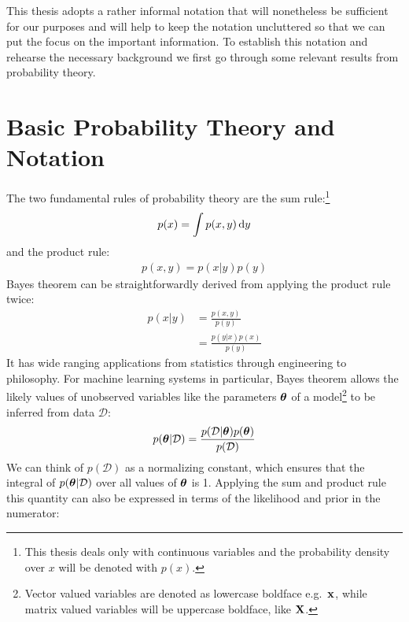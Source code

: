 \documentclass[../thesis.tex]{subfiles}
\begin{document}
This thesis adopts a rather informal notation that will nonetheless be sufficient for our purposes and will help to keep the notation uncluttered so that we can put the focus on the important information.
To establish this notation and rehearse the necessary background we first go through some relevant results from probability theory. 
\section{Basic Probability Theory and Notation}
The two fundamental rules of probability theory are the sum rule:\footnote{This thesis deals only with continuous variables and the probability density over $x$ will be denoted with $p(x)$.}
\begin{equation}
    \begin{split}
        p(x) = \int p(x, y) \mathop{}\!\mathrm{d} y
    \end{split}
\end{equation}
and the product rule:
\begin{equation}
    \begin{split}
        p(x, y) = p(x|y)p(y)
    \end{split}
\end{equation}
Bayes theorem can be straightforwardly derived from applying the product rule twice:
\begin{equation}
    \begin{split}
        p(x | y) &= \frac{p(x, y)}{p(y)}\\
        &= \frac{p(y | x) p(x)}  {p(y)}
    \end{split}
\end{equation}
It has wide ranging applications from statistics through engineering to philosophy. For machine learning systems in particular, Bayes theorem allows the likely values of unobserved variables like the parameters $\boldsymbol{\mathbf{\theta}}$ of a model\footnote{Vector valued variables are denoted as lowercase boldface e.g.\ $\boldsymbol{\mathbf{x}}$, while matrix valued variables will be uppercase boldface, like $\boldsymbol{\mathbf{X}}$.} to be inferred from data $\mathcal{D}$:
\begin{equation}
    \begin{split}
        p(\boldsymbol{\mathbf{\theta}} | \mathcal{D}) = \frac{p(\mathcal{D} | \boldsymbol{\mathbf{\theta}}) p(\boldsymbol{\mathbf{\theta}})}  {p(\mathcal{D})}
    \end{split}
\end{equation}
We can think of $p(\mathcal{D})$ as a normalizing constant, which ensures that the integral of $p(\boldsymbol{\mathbf{\theta}} | \mathcal{D})$ over all values of $\boldsymbol{\mathbf{\theta}}$ is 1. Applying the sum and product rule this quantity can also be expressed in terms of the likelihood and prior in the numerator:
\end{document}
